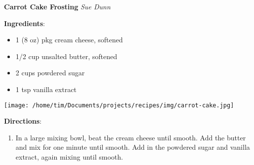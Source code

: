 \documentclass[11pt, twoside, openany]{book}
\begin{document}
\noindent\begin{minipage}[t]{\linewidth}%
{\Large\textbf{Carrot Cake Frosting}} \label{carrot-cake-frosting}\hfill\textit{Sue Dunn}\\
\noindent\begin{minipage}[t]{0.78\linewidth}%
\textbf{Ingredients}:\vspace{-3mm}
\begin{multicols}{2}
\begin{itemize}\setlength\itemsep{-1mm}
\item 1 (8 oz) pkg cream cheese, softened
\item 1/2 cup unsalted butter, softened
\item 2 cups powdered sugar
\item 1 tsp vanilla extract
\end{itemize}
\end{multicols}
\end{minipage}
\noindent\begin{minipage}[t]{0.18\linewidth}
\centering \strut\vspace*{-\baselineskip}\newline
\texttt{[image: /home/tim/Documents/projects/recipes/img/carrot-cake.jpg]}\\
\end{minipage}\vspace{3mm}
\textbf{Directions}:
\vspace{-3mm}\begin{enumerate}\setlength\itemsep{-1mm}
\item In a large mixing bowl, beat the cream cheese until smooth. Add the butter and mix for one minute until smooth. Add in the powdered sugar and vanilla extract, again mixing until smooth.
\end{enumerate}
\end{minipage}\vspace{8mm}
\end{document}
